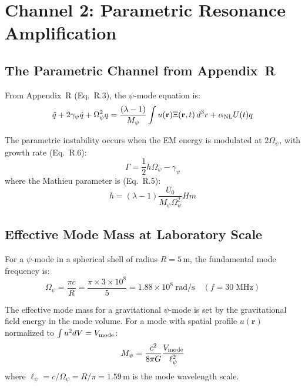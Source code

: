 \documentclass[12pt,letterpaper]{article}
\begin{document}
\section{Channel 2: Parametric Resonance Amplification}
\label{sec:parametric}

\subsection{The Parametric Channel from Appendix~R}

From Appendix~R (Eq.~R.3), the $\psi$-mode equation is:
\begin{equation}
\ddot{q} + 2\gamma_\psi\dot{q} + \Omega_\psi^2 q
= \frac{(\lambda - 1)}{M_\psi}\int u(\mathbf{r})\Xi(\mathbf{r},t)\,d^3r
+ \alpha_{\rm NL} U(t) q
\end{equation}

The parametric instability occurs when the EM energy is modulated at $2\Omega_\psi$,
with growth rate (Eq.~R.6):
\begin{equation}
\Gamma = \frac{1}{2}h\Omega_\psi - \gamma_\psi
\end{equation}
where the Mathieu parameter is (Eq.~R.5):
\begin{equation}
h = (\lambda - 1)\frac{U_0}{M_\psi \Omega_\psi^2}Hm
\end{equation}

\subsection{Effective Mode Mass at Laboratory Scale}

For a $\psi$-mode in a spherical shell of radius $R = 5$\,m, the fundamental
mode frequency is:
\begin{equation}
\Omega_\psi = \frac{\pi c}{R} = \frac{\pi \times 3 \times 10^8}{5} = 1.88 \times 10^8\;\text{rad/s} \quad (f = 30\;\text{MHz})
\end{equation}

The effective mode mass for a gravitational $\psi$-mode is set by the
gravitational field energy in the mode volume. For a mode with spatial
profile $u(\mathbf{r})$ normalized to $\int u^2 dV = V_{\rm mode}$:
\begin{equation}
M_\psi = \frac{c^2}{8\pi G}\frac{V_{\rm mode}}{\ell_\psi^2}
\end{equation}
where $\ell_\psi = c/\Omega_\psi = R/\pi = 1.59$\,m is the mode wavelength scale.
\end{document}
